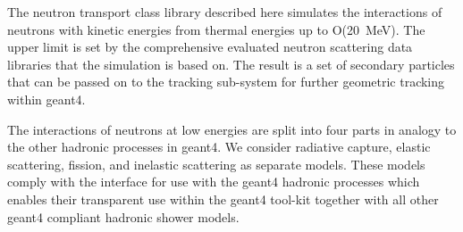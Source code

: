 The neutron transport class library described here 
simulates the interactions of neutrons with kinetic energies 
from thermal energies up to O(20~MeV). The upper limit is set by
the comprehensive evaluated neutron scattering data libraries that the
simulation is based on.
The result is a set of secondary particles that can be passed on to the
tracking sub-system for further 
geometric tracking within geant4. 

The interactions of neutrons at low energies are split
into four parts in analogy to the other hadronic processes in geant4. 
We consider radiative capture, elastic scattering, fission, and 
inelastic scattering as separate models. These models
comply with the interface for use with the geant4 hadronic processes
which enables their transparent use within the geant4 tool-kit together with
all other geant4 compliant hadronic shower models.
